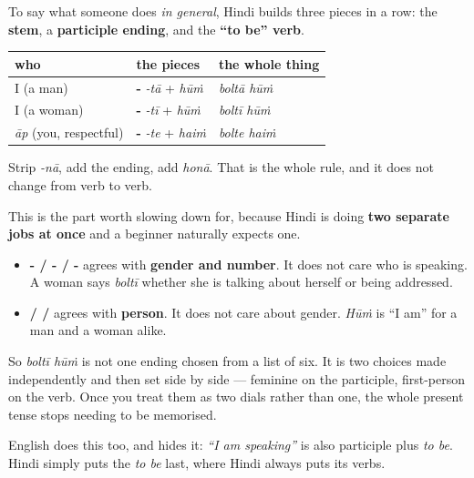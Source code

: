 \begin{grammarlens}[title={Grammar Lens: stem + -tā/-tī/-te + honā}]
To say what someone does \emph{in general}, Hindi builds three pieces in a row: the \textbf{stem}, a \textbf{participle ending}, and the \textbf{\textquotedblleft{}to be\textquotedblright{} verb}.

\noindent
\begin{tabularx}{\linewidth}{@{}>{\raggedright\arraybackslash}X>{\raggedright\arraybackslash}X>{\raggedright\arraybackslash}X@{}}
\toprule
\textbf{who} & \textbf{the pieces} & \textbf{the whole thing} \\
\midrule
I (a man) & \textbf{-\hi{ता}} \emph{-tā} + \textbf{\hi{हूँ}} \emph{hūṁ} & \textbf{\hi{बोलता} \hi{हूँ}} \emph{boltā hūṁ} \\
I (a woman) & \textbf{-\hi{ती}} \emph{-tī} + \textbf{\hi{हूँ}} \emph{hūṁ} & \textbf{\hi{बोलती} \hi{हूँ}} \emph{boltī hūṁ} \\
\emph{āp} (you, respectful) & \textbf{-\hi{ते}} \emph{-te} + \textbf{\hi{हैं}} \emph{haiṁ} & \textbf{\hi{बोलते} \hi{हैं}} \emph{bolte haiṁ} \\
\bottomrule
\end{tabularx}

Strip \emph{-nā}, add the ending, add \emph{honā}. That is the whole rule, and it does not change from verb to verb.
\end{grammarlens}

\begin{grammarlens}[title={Grammar Lens: the two agreements, and why they are two}]
This is the part worth slowing down for, because Hindi is doing \textbf{two separate jobs at once} and a beginner naturally expects one.

\begin{itemize}
\raggedright
  \item \textbf{- / - / -} agrees with \textbf{gender and number}. It does not care who is speaking. A woman says \emph{boltī} whether she is talking about herself or being addressed.
  \item \textbf{ /  / } agrees with \textbf{person}. It does not care about gender. \emph{Hūṁ} is \textquotedblleft{}I am\textquotedblright{} for a man and a woman alike.
\end{itemize}

So \emph{boltī hūṁ} is not one ending chosen from a list of six. It is two choices made independently and then set side by side — feminine on the participle, first-person on the verb. Once you treat them as two dials rather than one, the whole present tense stops needing to be memorised.

English does this too, and hides it: \emph{\textquotedblleft{}I am speaking\textquotedblright{}} is also participle plus \emph{to be}. Hindi simply puts the \emph{to be} last, where Hindi always puts its verbs.
\end{grammarlens}

